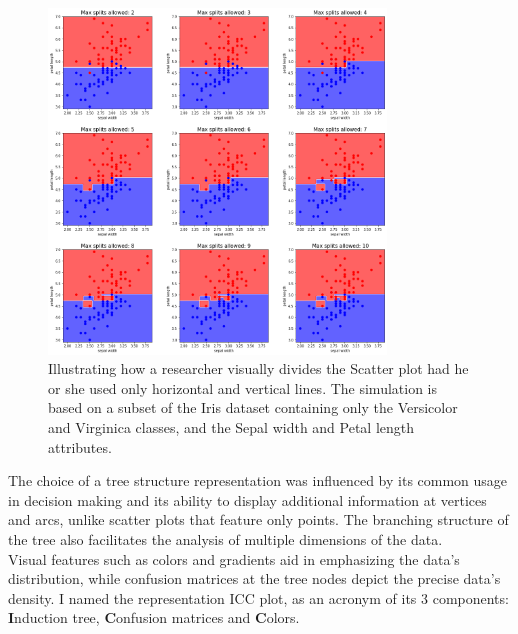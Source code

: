 \documentclass[11pt]{article}
\begin{document}
\begin{figure}[H]
\centering
\includegraphics[width=0.8\textwidth]{scatter_plot_illustration.png}

\caption{Illustrating how a researcher visually divides the Scatter plot had he or she used only horizontal and vertical lines. The simulation is based on a subset of the Iris dataset containing only the Versicolor and Virginica classes, and the Sepal width and Petal length attributes.}
\label{fig:fig1}

\end{figure}

The choice of a tree structure representation was influenced by its common usage in decision making and its ability to display additional information at vertices and arcs, unlike scatter plots that feature only points. The branching structure of the tree also facilitates the analysis of multiple dimensions of the data. \\
Visual features such as colors and gradients aid in emphasizing the data's distribution, while confusion matrices at the tree nodes depict the precise data's density. I named the representation ICC plot, as an acronym of its 3 components: \textbf{I}nduction tree, \textbf{C}onfusion matrices and \textbf{C}olors.
\end{document}
